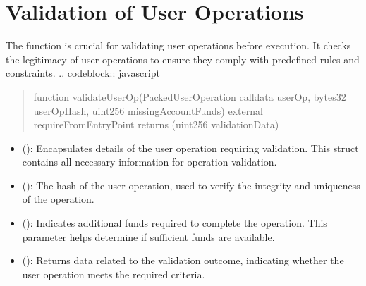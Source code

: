 \documentclass[a4paper,10pt,english]{sphinxmanual}
\begin{document}
\sphinxAtStartPar
{}


\section{Validation of User Operations}
\label{\detokenize{docs_minimal_account_abstraction:validation-of-user-operations}}
\sphinxAtStartPar
The  function is crucial for validating user operations before execution. It checks the legitimacy of user operations to ensure they comply with predefined rules and constraints.
.. code\sphinxhyphen{}block:: javascript
\begin{quote}

\sphinxAtStartPar
function validateUserOp(PackedUserOperation calldata userOp, bytes32 userOpHash, uint256 missingAccountFunds) external requireFromEntryPoint returns (uint256 validationData)
\end{quote}

\sphinxAtStartPar
{}
\begin{itemize}
\item {} 
\sphinxAtStartPar
{} ():
Encapsulates details of the user operation requiring validation. This struct contains all necessary information for operation validation.

\item {} 
\sphinxAtStartPar
{} ():
The hash of the user operation, used to verify the integrity and uniqueness of the operation.

\item {} 
\sphinxAtStartPar
{} ():
Indicates additional funds required to complete the operation. This parameter helps determine if sufficient funds are available.

\end{itemize}

\sphinxAtStartPar
{}
\begin{itemize}
\item {} 
\sphinxAtStartPar
{} ():
Returns data related to the validation outcome, indicating whether the user operation meets the required criteria.

\end{itemize}
\end{document}
